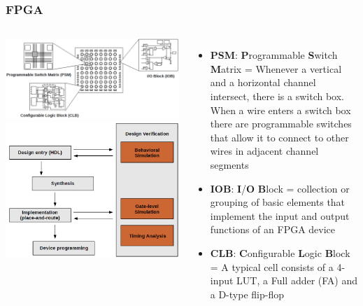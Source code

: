 \documentclass[aspectratio=169]{beamer}
\begin{document}
	\begin{frame}
	\frametitle{FPGA}
	\begin{columns}
		\begin{center}
			\includegraphics[width=0.75 \textwidth]{IMG/FPGA_PARTS.PNG}
			\includegraphics[width=0.65 \textwidth]{IMG/DesignFlow.PNG}
		\end{center}
		\begin{itemize}
			\item \textbf{PSM}: \textbf{P}rogrammable \textbf{S}witch \textbf{M}atrix = Whenever a vertical and a horizontal channel intersect, there is a switch box. When a wire enters a switch box there are programmable switches that allow it to connect to other wires in adjacent channel segments
			\item \textbf{IOB}: \textbf{I}/\textbf{O} \textbf{B}lock = collection or grouping of basic elements that implement the input and output functions of an FPGA device
			\item \textbf{CLB}: \textbf{C}onfigurable \textbf{L}ogic \textbf{B}lock = A typical cell consists of a 4-input LUT, a Full adder (FA) and a D-type flip-flop
		\end{itemize}
	\end{columns}
	\end{frame}
\end{document}
